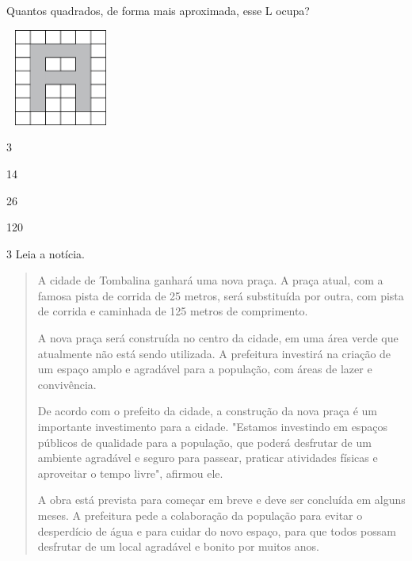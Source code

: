 \begin{multicols}{2}
Quantos quadrados, de forma mais aproximada, esse L ocupa?

\includegraphics[width=1.42949in,height=1.25160in]{media/image62.png}

\begin{minipage}{.5\textwidth}
\begin{escolha}
\item
  3
\item
  14
\item
  26
\item
  120
\end{escolha}
\end{minipage}



\num{3} Leia a notícia.

\begin{quote}
A cidade de Tombalina ganhará uma nova praça. A praça atual, com a famosa pista de corrida de 25 metros, será substituída por outra, com pista de corrida e caminhada de 125 metros de comprimento.

A nova praça será construída no centro da cidade, em uma área verde que atualmente não está sendo utilizada. A prefeitura investirá na criação de um espaço amplo e agradável para a população, com áreas de lazer e convivência.

De acordo com o prefeito da cidade, a construção da nova praça é um importante investimento para a cidade. "Estamos investindo em espaços públicos de qualidade para a população, que poderá desfrutar de um ambiente agradável e seguro para passear, praticar atividades físicas e aproveitar o tempo livre", afirmou ele.

A obra está prevista para começar em breve e deve ser concluída em alguns meses. A prefeitura pede a colaboração da população para evitar o desperdício de água e para cuidar do novo espaço, para que todos possam desfrutar de um local agradável e bonito por muitos anos.


\end{quote}
\end{multicols}
